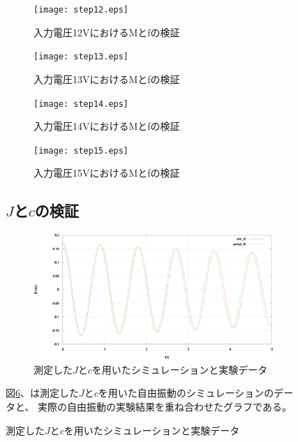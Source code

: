 \documentclass[a4j,11pt,twoside]{ujbook}
\begin{document}
\begin{figure}[htbp]
\begin{center}
	\begin{figure}[htbp]
		\begin{center}
			\texttt{[image: step12.eps]}
			\caption{入力電圧12VにおけるMとfの検証}
			\label{fig:step12}
		\end{center}
	\end{figure}
	
	\begin{figure}[htbp]
		\begin{center}
			\texttt{[image: step13.eps]}
			\caption{入力電圧13VにおけるMとfの検証}
			\label{fig:step13}
		\end{center}
	\end{figure}
	
	\begin{figure}[htbp]
		\begin{center}
			\texttt{[image: step14.eps]}
			\caption{入力電圧14VにおけるMとfの検証}
			\label{fig:step14}
		\end{center}
	\end{figure}
	
	\begin{figure}[htbp]
		\begin{center}
			\texttt{[image: step15.eps]}
			\caption{入力電圧15VにおけるMとfの検証}
			\label{fig:step15}
		\end{center}
	\end{figure}
	
	
	\subsection{$J$と$c$の検証}
	\begin{figure}[htbp]
		\begin{center}
			\includegraphics[width = 1.0 \linewidth]{freePendulum.eps}
			\caption{測定した$J$と$c$を用いたシミュレーションと実験データ}
			\label{fig:Jc}
		\end{center}
	\end{figure}
	図\ref{fig:Jc}、は測定した$J$と$c$を用いた自由振動のシミュレーションのデータと、
	実際の自由振動の実験結果を重ね合わせたグラフである。



\end{center}
\end{figure}
\end{document}
